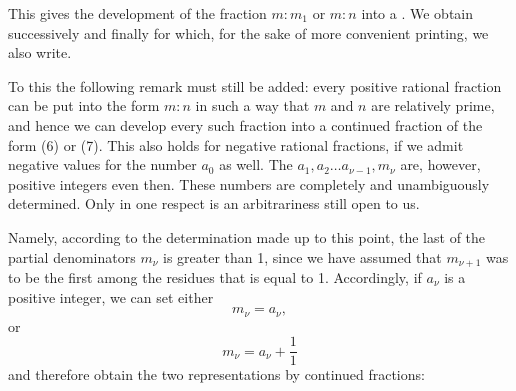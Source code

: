 
This gives the development of the fraction $m:m_1$ or $m:n$ into a . We obtain successively
and finally
for which, for the sake of more convenient printing, we also
write.

To this the following remark must still be added: every positive rational fraction can be put into the form $m:n$ in such a way that $m$ and $n$ are relatively prime, and hence we can develop every such fraction into a continued fraction of the form (6) or (7). This also holds for negative rational fractions, if we admit negative values for the number $a_0$ as well. The $a_1, a_2 \ldots a_{\nu-1}, m_\nu$ are, however, positive integers even then. These numbers are completely and unambiguously determined. Only in one respect is an arbitrariness still open to us.

Namely, according to the determination made up to this point, the last of the partial denominators $m_\nu$ is greater than 1, since we have assumed that $m_{\nu+1}$ was to be the first among the residues that is equal to 1. Accordingly, if $a_\nu$ is a positive integer, we can set either
\[
m_\nu = a_\nu,
\]
or
\[
m_\nu = a_\nu + \frac{1}{1}
\]
and therefore obtain the two representations by continued fractions:
